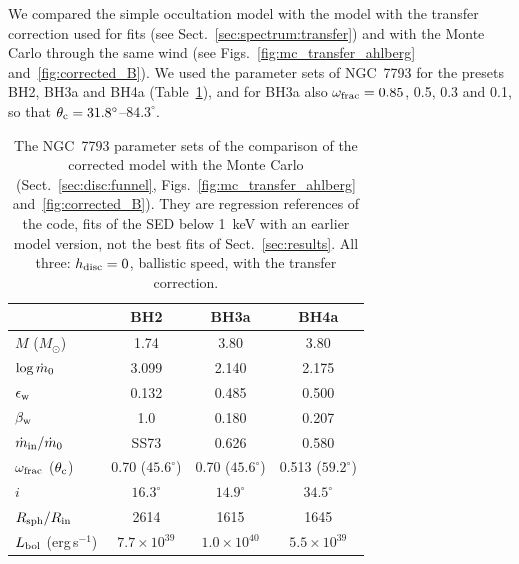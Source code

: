 We compared the simple occultation model with the model with the transfer correction used for fits (see Sect.~\ref{sec:spectrum:transfer})
and 
with the Monte Carlo through the same wind (see Figs.~\ref{fig:mc_transfer_ahlberg}  and~\ref{fig:corrected_B}).
We used the parameter sets of NGC~7793 for the presets BH2, BH3a and BH4a (Table~\ref{tab:ngc7793_sets}), and for BH3a also $\omega_{\rm frac} = 0.85$, 0.5, 0.3 and 0.1, so that $\theta_{\rm c} = 31.8^\circ$--$84.3^\circ$.

\begin{table}
\centering
\caption{The NGC~7793 parameter sets of the comparison of the corrected model with the Monte Carlo (Sect.~\ref{sec:disc:funnel}, Figs.~\ref{fig:mc_transfer_ahlberg} and~\ref{fig:corrected_B}).
They are regression references of the code, fits of the SED below 1~keV with an earlier model version, not the best fits of Sect.~\ref{sec:results}.
All three: $h_{\rm disc} = 0$, ballistic speed, with the transfer correction.}
\label{tab:ngc7793_sets}
\small
\begin{tabular}{@{}lccc@{}}
\toprule
 & BH2 & BH3a & BH4a \\
\midrule
$M$ ($M_\odot$) & 1.74 & 3.80 & 3.80 \\
$\log\dot m_0$ & 3.099 & 2.140 & 2.175 \\
$\epsilon_{\rm w}$ & 0.132 & 0.485 & 0.500 \\
$\beta_{\rm w}$ & 1.0 & 0.180 & 0.207 \\
$\dot m_{\rm in}/\dot m_0$ & SS73 & 0.626 & 0.580 \\
$\omega_{\rm frac}$ ($\theta_{\rm c}$) & 0.70 ($45.6^\circ$) & 0.70 ($45.6^\circ$) & 0.513 ($59.2^\circ$) \\
$i$ & $16.3^\circ$ & $14.9^\circ$ & $34.5^\circ$ \\
$R_{\rm sph}/R_{\rm in}$ & 2614 & 1615 & 1645 \\
$L_{\rm bol}$ (erg\,s$^{-1}$) & $7.7\times10^{39}$ & $1.0\times10^{40}$ & $5.5\times10^{39}$ \\
\bottomrule
\end{tabular}
\end{table}

